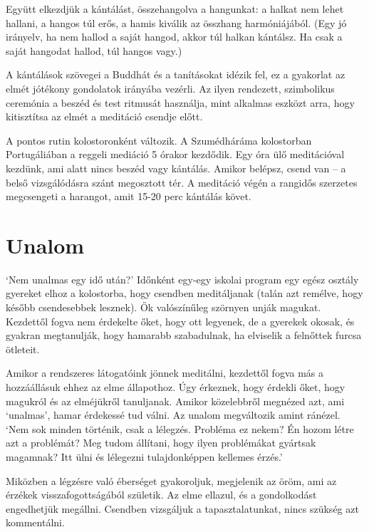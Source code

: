 Együtt elkezdjük a kántálást, összehangolva a hangunkat: a halkat nem
lehet hallani, a hangos túl erős, a hamis kiválik az összhang
harmóniájából. (Egy jó irányelv, ha nem hallod a saját hangod, akkor túl
halkan kántálsz. Ha csak a saját hangodat hallod, túl hangos vagy.)

A kántálások szövegei a Buddhát és a tanításokat idézik fel, ez a
gyakorlat az elmét jótékony gondolatok irányába vezérli. Az ilyen
rendezett, szimbolikus ceremónia a beszéd és test ritmusát használja,
mint alkalmas eszközt arra, hogy kitisztítsa az elmét a meditáció
csendje előtt.

A pontos rutin kolostoronként változik. A Szumédháráma kolostorban
Portugáliában a reggeli mediáció 5 órakor kezdődik. Egy óra ülő
meditációval kezdünk, ami alatt nincs beszéd vagy kántálás. Amikor
belépsz, csend van -- a belső vizsgálódásra szánt megosztott tér. A
meditáció végén a rangidős szerzetes megcsengeti a harangot, amit 15-20
perc kántálás követ.

\section{Unalom}


\noindent `Nem unalmas egy idő után?' Időnként egy-egy iskolai program
egy egész osztály gyereket elhoz a kolostorba, hogy csendben
meditáljanak (talán azt remélve, hogy később csendesebbek lesznek). Ők
valószínűleg szörnyen unják magukat. Kezdettől fogva nem érdekelte őket,
hogy ott legyenek, de a gyerekek okosak, és gyakran megtanulják, hogy
hamarabb szabadulnak, ha elviselik a felnőttek furcsa ötleteit.

Amikor a rendszeres látogatóink jönnek meditálni, kezdettől fogva más a
hozzáállásuk ehhez az elme állapothoz. Úgy érkeznek, hogy érdekli őket,
hogy magukról és az elméjükről tanuljanak. Amikor közelebbről megnézed
azt, ami `unalmas', hamar érdekessé tud válni. Az unalom megváltozik
amint ránézel. `Nem sok minden történik, csak a lélegzés. Probléma ez
nekem? Én hozom létre azt a problémát? Meg tudom állítani, hogy ilyen
problémákat gyártsak magamnak? Itt ülni és lélegezni tulajdonképpen
kellemes érzés.'

Miközben a légzésre való éberséget gyakoroljuk, megjelenik az öröm, ami
az érzékek visszafogottságából születik. Az elme ellazul, és a
gondolkodást engedhetjük megállni. Csendben vizsgáljuk a
tapasztalatunkat, nincs szükség azt kommentálni.

